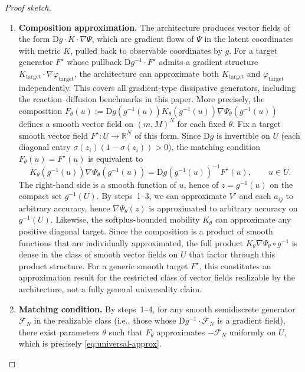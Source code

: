 \documentclass[hidelinks,review,nohypdvips,onefignum,onetabnum]{siamart220329}
\newcommand{\R}{\mathbb{R}}
\newcommand{\cFN}{\mathcal{F}_N}
\begin{document}
\begin{proof}[Proof sketch]
\begin{enumerate}
    \item \textbf{Composition approximation.} The architecture produces vector fields of the form $\mathrm{D}g\cdot K\cdot\nabla\Psi$, which are gradient flows of $\Psi$ in the latent coordinates with metric $K$, pulled back to observable coordinates by $g$. For a target generator $F^{\star}$ whose pullback $\mathrm{D}g^{-1}\cdot F^{\star}$ admits a gradient structure $K_{\mathrm{target}}\cdot\nabla\varphi_{\mathrm{target}}$, the architecture can approximate both $K_{\mathrm{target}}$ and $\varphi_{\mathrm{target}}$ independently. This covers all gradient-type dissipative generators, including the reaction--diffusion benchmarks in this paper. More precisely, the composition $F_{\theta}(u):=\mathrm{D}g(g^{-1}(u))K_{\theta}(g^{-1}(u))\nabla \Psi_{\theta}(g^{-1}(u))$ defines a smooth vector field on $(m,M)^N$ for each fixed $\theta$. Fix a target smooth vector field $F^{\star}:U\to\R^N$ of this form. Since $\mathrm{D}g$ is invertible on $U$ (each diagonal entry $\sigma(z_i)(1-\sigma(z_i))>0$), the matching condition $F_{\theta}(u)=F^{\star}(u)$ is equivalent to
    \begin{equation*}
    K_{\theta}(g^{-1}(u))\nabla \Psi_{\theta}(g^{-1}(u)) = \mathrm{D}g(g^{-1}(u))^{-1}F^{\star}(u), \qquad u\in U.
    \end{equation*}
    The right-hand side is a smooth function of $u$, hence of $z=g^{-1}(u)$ on the compact set $g^{-1}(U)$. By steps~1--3, we can approximate $V'$ and each $a_{ij}$ to arbitrary accuracy, hence $\nabla\Psi_{\theta}(z)$ is approximated to arbitrary accuracy on $g^{-1}(U)$. Likewise, the softplus-bounded mobility $K_{\theta}$ can approximate any positive diagonal target. Since the composition is a product of smooth functions that are individually approximated, the full product $K_{\theta}\nabla\Psi_{\theta}\circ g^{-1}$ is dense in the class of smooth vector fields on $U$ that factor through this product structure. For a generic smooth target $F^{\star}$, this constitutes an approximation result for the restricted class of vector fields realizable by the architecture, not a fully general universality claim.

    \item \textbf{Matching condition.} By steps~1--4, for any smooth semidiscrete generator $\cFN$ in the realizable class (i.e., those whose $\mathrm{D}g^{-1}\cdot \cFN$ is a gradient field), there exist parameters $\theta$ such that $F_{\theta}$ approximates $-\cFN$ uniformly on $U$, which is precisely \eqref{eq:universal-approx}.
\end{enumerate}
\end{proof}
\end{document}

